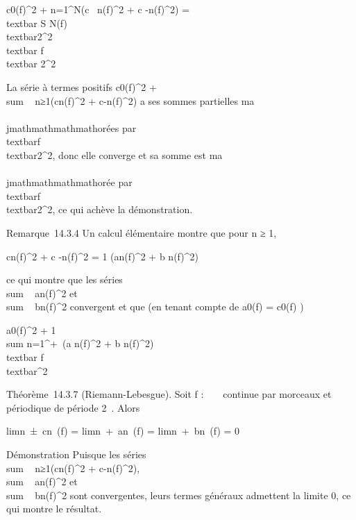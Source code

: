 \textbar{}c0(f)\textbar{}^2 +
\sum n=1^N(\textbar{}c~
n(f)\textbar{}^2 + \textbar{}c
-n(f)\textbar{}^2) =\\textbar{} S
N(f)\\textbar{}2^2
\leq\\textbar{} f\\textbar{}
2^2

La série à termes positifs
\textbar{}c0(f)\textbar{}^2
+ \\sum ~
n≥1(\textbar{}cn(f)\textbar{}^2 +
\textbar{}c-n(f)\textbar{}^2) a ses sommes
partielles ma\\\\jmathmathmathmathorées par
\\textbar{}f\\textbar{}2^2,
donc elle converge et sa somme est ma\\\\jmathmathmathmathorée par
\\textbar{}f\\textbar{}2^2,
ce qui achève la démonstration.

Remarque~14.3.4 Un calcul élémentaire montre que pour n ≥ 1,

\textbar{}cn(f)\textbar{}^2 + \textbar{}c
-n(f)\textbar{}^2 = 1 
(\textbar{}an(f)\textbar{}^2 + \textbar{}b
n(f)\textbar{}^2)

ce qui montre que les séries
\\sum ~
\textbar{}an(f)\textbar{}^2 et
\\sum ~
\textbar{}bn(f)\textbar{}^2 convergent et que (en
tenant compte de a0(f) = c0(f)
 )

 \textbar{}a0(f)\textbar{}^2  + 1  \\sum
n=1^+\infty~(\textbar{}a
n(f)\textbar{}^2 + \textbar{}b
n(f)\textbar{}^2) \leq\\textbar{}
f\\textbar{}^2

Théorème~14.3.7 (Riemann-Lebesgue). Soit f : ~ \rightarrow~  continue par morceaux
et périodique de période 2\pi~. Alors

limn\rightarrow~±\infty~cn~(f)
= limn\rightarrow~+\infty~an~(f)
= limn\rightarrow~+\infty~bn~(f) = 0

Démonstration Puisque les séries
\\sum ~
n≥1(\textbar{}cn(f)\textbar{}^2 +
\textbar{}c-n(f)\textbar{}^2),
\\sum ~
\textbar{}an(f)\textbar{}^2 et
\\sum ~
\textbar{}bn(f)\textbar{}^2 sont convergentes,
leurs termes généraux admettent la limite 0, ce qui montre le résultat.

